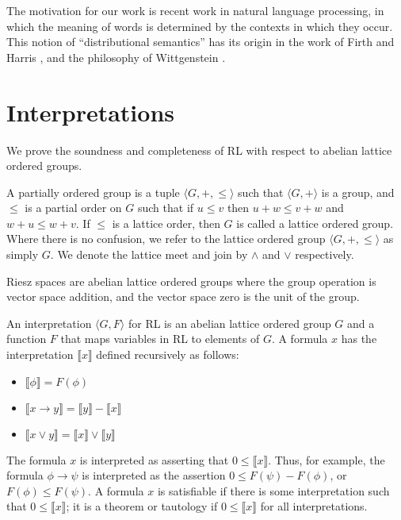 \documentclass[preprint,leqno]{elsarticle}
\newcommand{\interp}[1]{\llbracket #1 \rrbracket}
\begin{document}
The motivation for our work is recent work in natural language
processing, in which the meaning of words is determined by the
contexts in which they occur. This notion of ``distributional
semantics'' has its origin in the work of Firth \cite{Firth:57} and
Harris \cite{Harris:68}, and the philosophy of Wittgenstein
\cite{Wittgenstein:53}.

\section{Interpretations}

We prove the soundness and completeness of RL with respect to
abelian lattice ordered groups.

\begin{definition}
  A partially ordered group is a tuple $\langle G, +, \le\rangle$ such
  that $\langle G, +\rangle$ is a group, and $\le$ is a partial order
  on $G$ such that if $u \le v$ then $u + w \le v + w$ and $w + u \le
  w + v$. If $\le$ is a lattice order, then $G$ is called a lattice
  ordered group. Where there is no confusion, we refer to the lattice
  ordered group $\langle G, +, \le\rangle$ as simply $G$. We denote
  the lattice meet and join by $\land$ and $\lor$ respectively.
\end{definition}

Riesz spaces are abelian lattice ordered groups where the group
operation is vector space addition, and the vector space zero is the
unit of the group.

An interpretation $\langle G, F\rangle$ for RL is an abelian lattice
ordered group $G$ and a function $F$ that maps variables in RL to
elements of $G$. A formula $x$ has the interpretation $\interp{x}$
defined recursively as follows:
\begin{itemize}
\item $\interp{\phi} = F(\phi)$
\item $\interp{x \rightarrow y} = \interp{y} - \interp{x}$
\item $\interp{x \lor y} = \interp{x} \lor \interp{y}$
\end{itemize}
The formula $x$ is interpreted as asserting that $0 \le
\interp{x}$. Thus, for example, the formula $\phi \rightarrow \psi$ is
interpreted as the assertion $0 \le F(\psi) - F(\phi)$, or $F(\phi)
\le F(\psi)$. A formula $x$ is satisfiable if there is some
interpretation such that $0 \le \interp{x}$; it is a theorem or
tautology if $0 \le \interp{x}$ for all interpretations.
\end{document}
